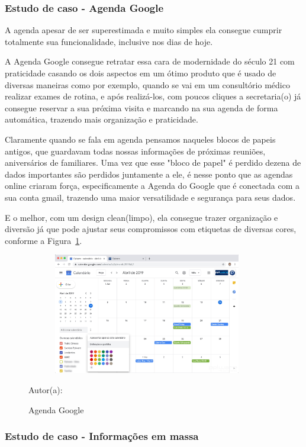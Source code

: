 \subsubsection{Estudo de caso - Agenda Google}

A agenda apesar de ser superestimada e muito simples ela consegue cumprir totalmente sua funcionalidade, inclusive nos dias de hoje. 

A Agenda Google consegue retratar essa cara de modernidade do século 21 com praticidade casando os dois aspectos em um ótimo produto que é usado de diversas maneiras como por exemplo, quando se vai em um consultório médico realizar exames de rotina, e após realizá-los, com poucos cliques a secretaria(o) já consegue reservar a sua próxima visita e marcando na sua agenda de forma automática, trazendo mais organização e praticidade.

Claramente quando se fala em agenda pensamos naqueles blocos de papeis antigos, que guardavam todas nossas informações de próximas reuniões, aniversários de familiares. Uma vez que esse "bloco de papel"   é perdido dezena de dados importantes são perdidos juntamente a ele, é nesse ponto que as agendas online criaram força, especificamente a Agenda do Google que é conectada com a sua conta gmail, trazendo uma maior versatilidade e segurança para seus dados.

E o melhor, com um design clean(limpo), ela consegue trazer organização e diversão já que pode ajustar seus compromissos com etiquetas de diversas cores, conforme a Figura~\hypersetup{linkcolor=black}\ref{fig:agenda}.

\begin{figure}[!h]
	\centering
	\caption{Agenda Google}
	\label{fig:agenda}
	\includegraphics[width=400px, height=200px]{./images/agenda.jpg}
	\par {Autor(a): \cite{agenda}}
\end{figure}


\newpage

\subsubsection{Estudo de caso - Informações em massa}

